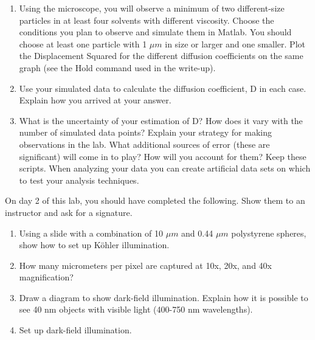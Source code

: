 \documentclass{../signatures}
\begin{document}
\begin{enumerate}

\item Using the microscope, you will observe a minimum of two different-size particles in at least four solvents with different viscosity. Choose the conditions you plan to observe and simulate them in Matlab. You should choose at least one particle with 1 $\mu m$ in size or larger and one smaller. Plot the Displacement Squared for the different diffusion coefficients on the same graph (see the Hold command used in the write-up).

\item Use your simulated data to calculate the diffusion coefficient, D in each case. Explain how you arrived at your answer. 


\newpage

\item What is the uncertainty of your estimation of D? How does it vary with the number of simulated data points? Explain your strategy for making observations in the lab. What additional sources of error (these are significant) will come in to play? How will you account for them? Keep these scripts. When analyzing your data you can create artificial data sets on which to test your analysis techniques. 
\\[36pt]
\end{enumerate}


\midlab

On day 2 of this lab, you should have completed the following. Show them to an instructor and ask for a signature.

\begin{enumerate}

    \item Using a slide with a combination of 10 $\mu m$ and 0.44 $\mu m$ polystyrene spheres, show how to set up K\"ohler illumination.
    
    \item How many micrometers per pixel are captured at 10x, 20x, and 40x magnification?
    
    \item Draw a diagram to show dark-field illumination. Explain how it is possible to see 40 nm objects with visible light (400-750 nm wavelengths).
    
    \item Set up dark-field illumination.
\\[36pt]
\end{enumerate}
\end{document}
